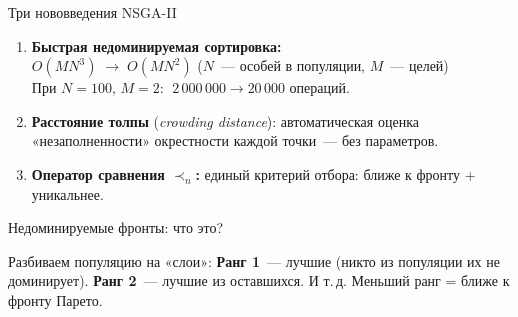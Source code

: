 \documentclass[aspectratio=169,11pt]{beamer}
\begin{document}
\begin{frame}{Три нововведения NSGA-II}
  \large
  \begin{enumerate}
    \item \textbf{Быстрая недоминируемая сортировка:}\\
          $O(MN^3) \;\to\; O(MN^2)$ \quad\small($N$~--- особей в популяции, $M$~--- целей)\\
          \normalsize При $N{=}100,\,M{=}2$: $\;2\,000\,000 \to 20\,000$ операций.

    \vspace{0.4cm}
    \item \textbf{Расстояние толпы} (\textit{crowding distance}):
          автоматическая оценка «незаполненности» окрестности каждой точки~---
          без параметров.

    \vspace{0.4cm}
    \item \textbf{Оператор сравнения $\prec_n$:}
          единый критерий отбора: ближе к фронту + уникальнее.
  \end{enumerate}
\end{frame}

\begin{frame}{Недоминируемые фронты: что это?}
  \begin{exampleblock}{}
    Разбиваем популяцию на «слои»:
    \textbf{Ранг 1}~--- лучшие (никто из популяции их не доминирует).
    \textbf{Ранг 2}~--- лучшие из оставшихся. И т.\,д.
    Меньший ранг = ближе к фронту Парето.
  \end{exampleblock}
  \vspace{0.2cm}
  \centering
\end{frame}
\end{document}
